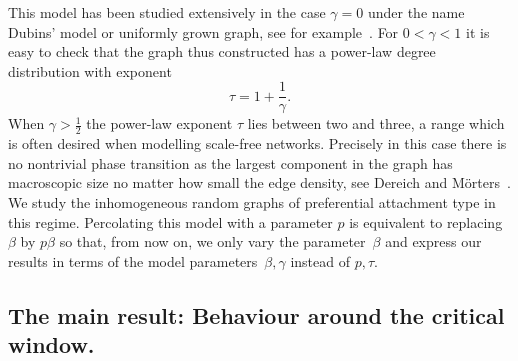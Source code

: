 \documentclass[12pt,a4paper]{article}
\numberwithin{equation}{section}
\begin{document}
This model has been studied extensively in the case $\gamma=0$ under the name Dubins' model or uniformly grown graph, see for example~\cite{bjr, JMM}. For $0<\gamma<1$ it is easy to check that the graph thus constructed has a power-law degree distribution with exponent $$\tau=1+\frac1\gamma.$$
%
When $\gamma>\frac12$ the power-law exponent $\tau$ lies
between two and three, a range which is often desired when modelling scale-free networks. Precisely in this case there is no nontrivial phase transition
as the largest component in the graph has macroscopic size no matter how small the edge density, see Dereich and M\"orters~\cite{dm, wll}. We study the inhomogeneous random graphs of preferential attachment type in this regime. Percolating this model with a parameter $p$ is equivalent to replacing $\beta$ by $p\beta$ so that, from now on, we only vary the parameter~$\beta$ and express our results in terms of the model 
parameters~$\beta,\gamma$ instead of $p,\tau$.



\subsection{The main result: Behaviour around the critical window.}
\label{2.2}
\end{document}
